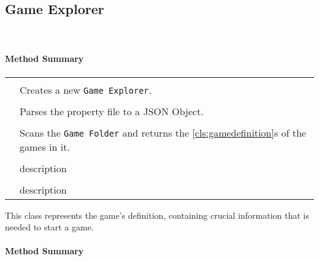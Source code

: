\subsection{Game Explorer}

 \\

\centerdash

\paragraph*{Method Summary}
\paragraph*{}
\begin{longtable}{Lp{10cm}}
	\startmethodtable
	 \\
	& Creates a new \texttt{Game Explorer}. \\
	 \\
	& Parses the property file to a JSON Object. \\
	 \\
	& Scans the \texttt{Game Folder} and returns the \ref{cls:gamedefinition}s of the games in it. \\
	 \\
	& description \\
	 \\
	& description \\
	\hline
\end{longtable}

\pagebreak

This class represents the game's definition, containing crucial information that is needed to start a game.

\centerdash
\paragraph*{Method Summary}
